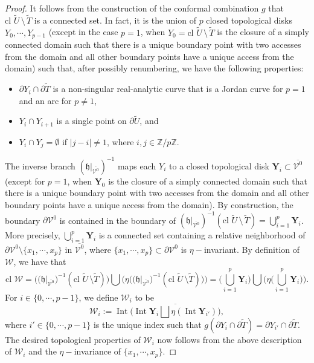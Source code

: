 \documentclass[11pt,a4paper, oneside]{amsart}
\theoremstyle{definition}
\theoremstyle{remark}
\DeclareMathOperator{\Int}{Int}
\numberwithin{equation}{section}
\def\Z{{\mathbb{Z}}}
\def\cV{\mathcal {V}}
\def\cW{\mathcal {W}}
\newcommand{\sm}{\setminus}
\renewcommand{\tilde}{\widetilde}
\newcommand{\clo}{{\text{cl}}\,\,}
\begin{document}
\begin{proof}
It follows from the construction of the conformal combination $g$ that $\clo\tilde U\,\setminus\, \tilde T$ is a connected set. In fact, it is the union of $p$ closed topological disks $Y_0,\cdots,Y_{p-1}$ (except in the case $p=1$, when $Y_0=\clo\tilde U\,\setminus\, \tilde T$ is the closure of a simply connected domain such that there is a unique boundary point with two accesses from the domain and all other boundary points have a unique access from the domain)  such that, after possibly renumbering, we have the following properties:
\begin{itemize}[leftmargin=8mm]
\item $\partial Y_i\cap\partial \tilde T$ is a non-singular real-analytic curve that is a Jordan curve for $p=1$ and an arc for $p\neq 1$,
\item $Y_i\cap Y_{i+1}$ is a single point on $\partial\tilde U$, and
\item $Y_i\cap Y_j=\emptyset$ if $\vert j-i\vert\neq1$, where $i,j\in\Z/p\Z$.
\end{itemize}
The inverse branch $(\mathfrak{h}\vert_{\overline{\cV^0}})^{-1}$ maps each $Y_i$ to a closed topological disk $\pmb{Y}_i\subset \overline{\cV^0}$ (except for $p=1$, when $\pmb{Y}_0$ is the closure of a simply connected domain such that there is a unique boundary point with two accesses from the domain and all other boundary points have a unique access from the domain). By construction, the boundary $\partial\cV^0$ is contained in the boundary of $\left(\mathfrak{h}\vert_{\overline{\cV^0}}\right)^{-1}(\clo \tilde U\,\sm\,\tilde T)=\bigcup_{i=1}^p \pmb{Y}_i$. More precisely, $\bigcup_{i=1}^p \pmb{Y}_i$ is a connected set  containing a relative neighborhood of $\partial\cV^0\setminus\{x_1,\cdots,x_p\}$ in $\overline{\cV^0}$, where $\{x_1,\cdots,x_p\}\subset\partial\cV^0$ is $\eta-$invariant.
By definition of $\pmb{\cW}$, we have that
\begin{equation*}
\clo \pmb{\mathcal{W}} = \Bigg(\big(\mathfrak{h}\big|_{\overline{\cV^0}}\big)^{-1}(\clo\tilde U\,\sm\tilde T)\Bigg)\bigcup\Bigg(\eta\Big(\big(\mathfrak{h}\big|_{\overline{\cV^0}}\big)^{-1}(\clo\tilde U\,\sm\tilde T)\Big)\Bigg)
= \Big(\bigcup_{i=1}^p \pmb{Y}_i\Big)\bigcup\Bigg(\eta\Big(\bigcup_{i=1}^p \pmb{Y}_i\Big)\Bigg).
\end{equation*}
For $i\in\{0,\cdots,p-1\}$, we define $\pmb{\cW}_i$ to be 
$$
\pmb{\cW}_i:=\Int{\Bigg(\overline{\Int{\pmb{Y}_i}\bigsqcup\eta(\Int{\pmb{Y}_{i'}})}\Bigg)},
$$ 
where $i'\in\{0,\cdots,p-1\}$ is the unique index such that $g(\partial Y_i\cap\partial\tilde T)=\partial Y_{i'}\cap\partial\tilde T$.
The desired topological properties of $\pmb{\cW}_i$ now follows from the above description of $\pmb{\cW}_i$ and the $\eta-$invariance of $\{x_1,\cdots,x_p\}$.
\end{proof}
\end{document}

